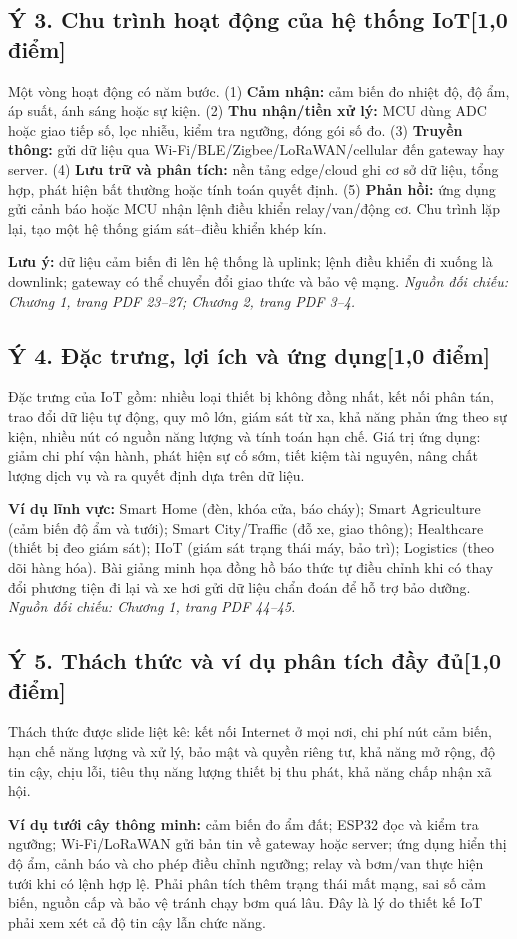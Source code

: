 \documentclass[12pt,a4paper]{article}
\newcommand{\muc}[1]{\subsection*{#1\hfill{\color{teal}\normalsize [1,0 điểm]}}}
\newcommand{\nguon}[1]{{\small\itshape\color{navy}Nguồn đối chiếu: #1.}}
\begin{document}
\muc{Ý 3. Chu trình hoạt động của hệ thống IoT}
Một vòng hoạt động có năm bước. (1) \textbf{Cảm nhận:} cảm biến đo nhiệt độ, độ ẩm, áp suất, ánh sáng hoặc sự kiện. (2) \textbf{Thu nhận/tiền xử lý:} MCU dùng ADC hoặc giao tiếp số, lọc nhiễu, kiểm tra ngưỡng, đóng gói số đo. (3) \textbf{Truyền thông:} gửi dữ liệu qua Wi-Fi/BLE/Zigbee/LoRaWAN/cellular đến gateway hay server. (4) \textbf{Lưu trữ và phân tích:} nền tảng edge/cloud ghi cơ sở dữ liệu, tổng hợp, phát hiện bất thường hoặc tính toán quyết định. (5) \textbf{Phản hồi:} ứng dụng gửi cảnh báo hoặc MCU nhận lệnh điều khiển relay/van/động cơ. Chu trình lặp lại, tạo một hệ thống giám sát--điều khiển khép kín.

\textbf{Lưu ý:} dữ liệu cảm biến đi lên hệ thống là uplink; lệnh điều khiển đi xuống là downlink; gateway có thể chuyển đổi giao thức và bảo vệ mạng. \nguon{Chương 1, trang PDF 23--27; Chương 2, trang PDF 3--4}

\muc{Ý 4. Đặc trưng, lợi ích và ứng dụng}
Đặc trưng của IoT gồm: nhiều loại thiết bị không đồng nhất, kết nối phân tán, trao đổi dữ liệu tự động, quy mô lớn, giám sát từ xa, khả năng phản ứng theo sự kiện, nhiều nút có nguồn năng lượng và tính toán hạn chế. Giá trị ứng dụng: giảm chi phí vận hành, phát hiện sự cố sớm, tiết kiệm tài nguyên, nâng chất lượng dịch vụ và ra quyết định dựa trên dữ liệu.

\textbf{Ví dụ lĩnh vực:} Smart Home (đèn, khóa cửa, báo cháy); Smart Agriculture (cảm biến độ ẩm và tưới); Smart City/Traffic (đỗ xe, giao thông); Healthcare (thiết bị đeo giám sát); IIoT (giám sát trạng thái máy, bảo trì); Logistics (theo dõi hàng hóa). Bài giảng minh họa đồng hồ báo thức tự điều chỉnh khi có thay đổi phương tiện đi lại và xe hơi gửi dữ liệu chẩn đoán để hỗ trợ bảo dưỡng. \nguon{Chương 1, trang PDF 44--45}

\muc{Ý 5. Thách thức và ví dụ phân tích đầy đủ}
Thách thức được slide liệt kê: kết nối Internet ở mọi nơi, chi phí nút cảm biến, hạn chế năng lượng và xử lý, bảo mật và quyền riêng tư, khả năng mở rộng, độ tin cậy, chịu lỗi, tiêu thụ năng lượng thiết bị thu phát, khả năng chấp nhận xã hội.

\textbf{Ví dụ tưới cây thông minh:} cảm biến đo ẩm đất; ESP32 đọc và kiểm tra ngưỡng; Wi-Fi/LoRaWAN gửi bản tin về gateway hoặc server; ứng dụng hiển thị độ ẩm, cảnh báo và cho phép điều chỉnh ngưỡng; relay và bơm/van thực hiện tưới khi có lệnh hợp lệ. Phải phân tích thêm trạng thái mất mạng, sai số cảm biến, nguồn cấp và bảo vệ tránh chạy bơm quá lâu. Đây là lý do thiết kế IoT phải xem xét cả độ tin cậy lẫn chức năng.
\end{document}
